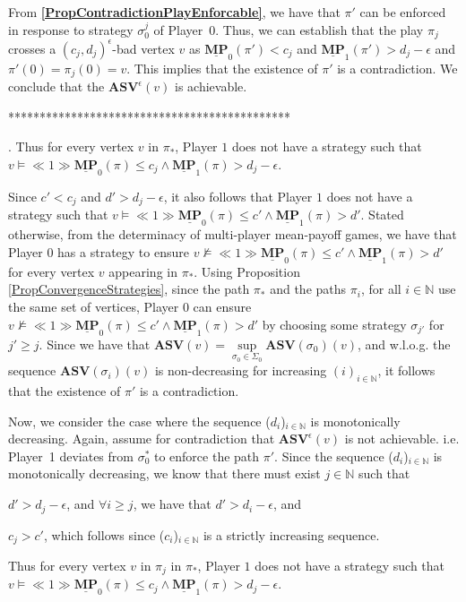 From \textbf{\cref{PropContradictionPlayEnforcable}}, we have that $\pi'$ can be enforced in response to strategy $\sigma_0^j$ of Player~0. Thus, we can establish that the play $\pi_j$ crosses a $(c_j, d_j)^{\epsilon}$-bad vertex $v$ as $\underline{\mathbf{MP}}_0(\pi') < c_j$ and $ \underline{\mathbf{MP}}_1(\pi') > d_j-\epsilon$ and $\pi'(0) = \pi_j(0) = v$. This implies that the existence of $\pi'$ is a contradiction. We conclude that the $\mathbf{ASV}^{\epsilon}(v)$ is achievable.

*********************************************

.
Thus for every vertex $v$ in $\pi_*$, Player $1$ does not have a strategy such that $v \models \ll 1 \gg \underline{\mathbf{MP}}_0(\pi) \leqslant c_j \land \underline{\mathbf{MP}}_1(\pi) > d_j-\epsilon$.

Since $c' < c_j$ and $d' > d_j-\epsilon$, it also follows that Player $1$ does not have a strategy such that $v \models \ll 1 \gg \underline{\mathbf{MP}}_0(\pi) \leqslant c' \land \underline{\mathbf{MP}}_1(\pi) > d'$.
Stated otherwise, from the determinacy of multi-player mean-payoff games, we have that Player $0$ has a strategy to ensure $v \not \models \ll 1 \gg \underline{\mathbf{MP}}_0(\pi) \leqslant c' \land \underline{\mathbf{MP}}_1(\pi) > d'$ for every vertex $v$ appearing in $\pi_*$.
Using Proposition \ref{PropConvergenceStrategies}, since the path $\pi_*$ and the paths $\pi_i$, for all $i \in \mathbb{N}$ use the same set of vertices, Player $0$ can ensure $v \not \models \ll 1 \gg \underline{\mathbf{MP}}_0(\pi) \leqslant c' \land \underline{\mathbf{MP}}_1(\pi) > d'$ by choosing some strategy $\sigma_{j'}$ for $j' \ge j$.
Since we have that $\mathbf{ASV}(v) = \sup\limits_{\sigma_0 \in \Sigma_0} \mathbf{ASV}(\sigma_0)(v)$, and w.l.o.g. the sequence $\mathbf{ASV}(\sigma_i)(v)$ is non-decreasing for increasing $(i)_{i \in \mathbb{N}}$, it follows that the existence of $\pi'$ is a contradiction.

Now, we consider the case where the sequence ($d_i$)$_{i \in \mathbb{N}}$ is monotonically decreasing.
Again, assume for contradiction that $\mathbf{ASV}^{\epsilon}(v)$ is not achievable.  i.e. Player~1 deviates from $\sigma_0^*$ to enforce the path $\pi'$.
Since the sequence ($d_i$)$_{i \in \mathbb{N}}$ is monotonically decreasing, we know that there must exist $j \in \mathbb{N}$ such that 
\begin{inparaenum}[(i)]
\item $d' > d_j - \epsilon$, and $\forall i \geqslant j$, we have that $d' > d_i - \epsilon$, and
\item $c_j > c'$, which follows since ($c_i$)$_{i \in \mathbb{N}}$ is a strictly increasing sequence.
\end{inparaenum}
Thus for every vertex $v$ in $\pi_j$ in $\pi_*$, Player $1$ does not have a strategy such that $v \models \ll 1 \gg \underline{\mathbf{MP}}_0(\pi) \leqslant c_j \land \underline{\mathbf{MP}}_1(\pi) > d_j-\epsilon$.

